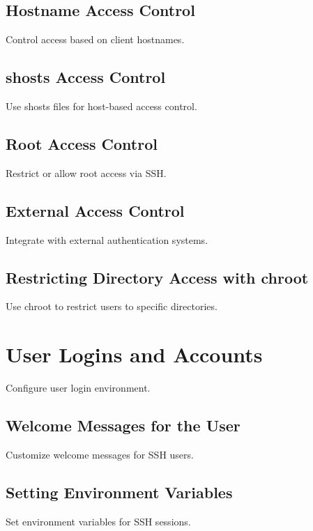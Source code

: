 \documentclass[12pt]{book}
\begin{document}
\subsection{Hostname Access Control}

Control access based on client hostnames.

\subsection{shosts Access Control}

Use shosts files for host-based access control.

\subsection{Root Access Control}

Restrict or allow root access via SSH.

\subsection{External Access Control}

Integrate with external authentication systems.

\subsection{Restricting Directory Access with chroot}

Use chroot to restrict users to specific directories.

\section{User Logins and Accounts}

Configure user login environment.

\subsection{Welcome Messages for the User}

Customize welcome messages for SSH users.

\subsection{Setting Environment Variables}

Set environment variables for SSH sessions.
\end{document}
